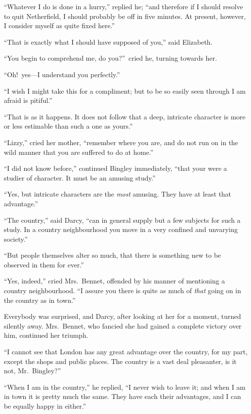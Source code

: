 \documentclass[12pt,english]{book}
\begin{document}
{}``Whatever I do is done in a hurry,'' replied he; {}``and therefore
if I should resolve to quit Netherfield, I should probably be off
in five minutes. At present, however, I consider myself as quite fixed
here.''

{}``That is exactly what I should have supposed of you,'' said Elizabeth.

{}``You begin to comprehend me, do you?''\ cried he, turning towards
her.

{}``Oh!\ yes\mbox{---}I understand you perfectly.''

{}``I wish I might take this for a compliment; but to be so easily
seen through I am afraid is pitiful.''

{}``That is as it happens. It does not follow that a deep, intricate
character is more or less estimable than such a one as yours.''

{}``Lizzy,'' cried her mother, {}``remember where you are, and
do not run on in the wild manner that you are suffered to do at home.''

{}``I did not know before,'' continued Bingley immediately, {}``that
your were a studier of character. It must be an amusing study.''

{}``Yes, but intricate characters are the \textit{most} amusing.
They have at least that advantage.''

{}``The country,'' said Darcy, {}``can in general supply but a
few subjects for such a study. In a country neighbourhood you move
in a very confined and unvarying society.''

{}``But people themselves alter so much, that there is something
new to be observed in them for ever.''

{}``Yes, indeed,'' cried Mrs.\ Bennet, offended by his manner of
mentioning a country neighbourhood. {}``I assure you there is quite
as much of \textit{that} going on in the country as in town.''

Everybody was surprised, and Darcy, after looking at her for a moment,
turned silently away. Mrs.\ Bennet, who fancied she had gained a
complete victory over him, continued her triumph.

{}``I cannot see that London has any great advantage over the country,
for my part, except the shops and public places. The country is a
vast deal pleasanter, is it not, Mr.\ Bingley?''\


{}``When I am in the country,'' he replied, {}``I never wish to
leave it; and when I am in town it is pretty much the same. They have
each their advantages, and I can be equally happy in either.''
\end{document}
